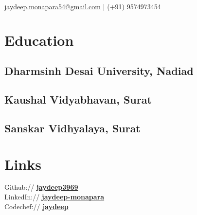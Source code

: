 \documentclass[]{jaydeep-resume-openfont}
\begin{document}
%
%
\lastupdated

%
%
{ \href{mailto:jaydeep.mmonapara54@gmail.com}{jaydeep.monapara54@gmail.com} | (+91) 9574973454 }

%
%

\begin{minipage}[t]{0.29\textwidth}


\section{Education}

\subsection{Dharmsinh Desai \newline University, Nadiad}
\sectionsep

\subsection{Kaushal Vidyabhavan, \newline Surat}
\sectionsep

\subsection{Sanskar Vidhyalaya, \newline Surat}
\sectionsep


\section{Links}

Github:// \href{https://github.com/jaydeep3969}{\bf jaydeep3969} \\
LinkedIn://  \href{https://in.linkedin.com/in/jaydeep-monapara-a70a48119}{\bf jaydeep-monapara} \\
Codechef:// \href {https://www.codechef.com/users/jaydeep_3969}{\bf jaydeep} \\


\end{minipage}
\end{document}
